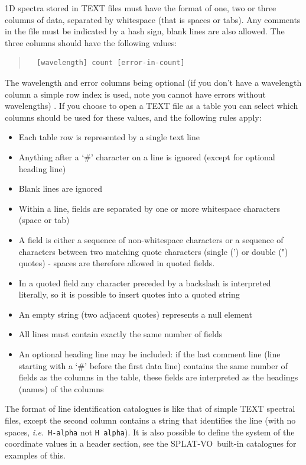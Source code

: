 \documentclass[twoside,11pt]{article}
\renewcommand{\_}{\texttt{\symbol{95}}}
\newcommand{\SPLAT}{\textsf{SPLAT-VO}}
\newcommand{\hitext}[1]{\texttt{#1}}
\newcommand{\ie}{\textit{i.e.}}
\begin{document}
1D spectra stored in TEXT files must have the format of one, two or three
columns of data, separated by whitespace (that is spaces or tabs). Any
comments in the file must be indicated by a hash sign, blank lines are also
allowed. The three columns should have the following values:
\begin{quote}
\begin{verbatim}
  [wavelength] count [error-in-count]
\end{verbatim}
\end{quote}
The wavelength and error columns being optional (if you don't have a
wavelength column a simple row index is used, note you cannot have errors
without wavelengths) . If you choose to open a TEXT file as a table you can
select which columns should be used for these values, and the following rules
apply:
\begin{itemize}
\item Each table row is represented by a single text line
\item Anything after a `\#' character on a line is ignored (except for optional
      heading line)
\item Blank lines are ignored
\item Within a line, fields are separated by one or more whitespace characters
      (space or tab)
\item A field is either a sequence of non-whitespace characters or a sequence
      of characters between two matching quote characters (single (') or double (")
      quotes) - spaces are therefore allowed in quoted fields.
\item In a quoted field any character preceded by a backslash is interpreted
      literally, so it is possible to insert quotes into a quoted string
\item An empty string (two adjacent quotes) represents a null element
\item All lines must contain exactly the same number of fields
\item An optional heading line may be included: if the last comment line (line
      starting with a `\#' before the first data line) contains the same number of
      fields as the columns in the table, these fields are interpreted as the
      headings (names) of the columns
\end{itemize}

The format of line identification catalogues is like that of simple TEXT
spectral files, except the second column contains a string that identifies the
line (with no spaces, \ie\ \hitext{H-alpha} not \hitext{H alpha}). It is also
possible to define the system of the coordinate values in a header section,
see the \SPLAT\ built-in catalogues for examples of this.
\end{document}
